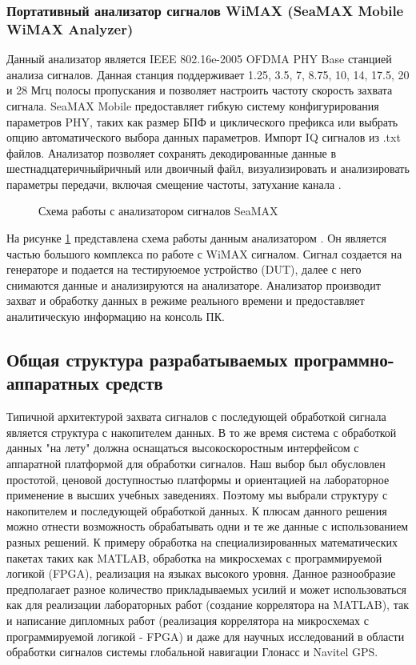 \subsubsection{Портативный анализатор сигналов WiMAX (SeaMAX Mobile WiMAX Analyzer)}
Данный анализатор является IEEE 802.16e-2005 OFDMA PHY Base станцией анализа сигналов. Данная станция 
поддерживает 1.25, 3.5, 7, 8.75, 10, 14, 17.5, 20 и 28 Мгц полосы пропускания и позволяет настроить
частоту скорость захвата сигнала. SeaMAX Mobile предоставляет гибкую систему конфигурирования параметров PHY, таких как
размер БПФ и циклического префикса или выбрать опцию автоматического выбора данных параметров. Импорт IQ сигналов
из .txt файлов. Анализатор позволяет сохранять декодированные данные в шестнадцатеричныйричный или двоичный файл,
визуализировать и анализировать параметры передачи, включая смещение частоты, затухание канала
\cite{seamax_overview, seamax_pdf}.

\begin{figure}[H]
\caption{Схема работы с анализатором сигналов SeaMAX}
\label{seamax}
\end{figure}

На рисунке \ref{seamax} представлена схема работы данным анализатором \cite{seamax_pdf}. Он является частью большого комплекса по работе
с WiMAX сигналом. Сигнал создается на генераторе и подается на тестируюемое устройство (DUT), далее с него снимаются 
данные и анализируются на анализаторе. Анализатор производит захват и обработку данных в режиме реального времени и
предоставляет аналитическую информацию на консоль ПК.

\subsection{Общая структура разрабатываемых программно-аппаратных средств}
\label{razdel13}

Типичной архитектурой захвата сигналов с последующей обработкой сигнала является структура с накопителем данных. В то же время
система с обработкой данных "на лету" должна оснащаться высокоскоростным интерфейсом с аппаратной платформой для обработки
сигналов. Наш выбор был обусловлен простотой, ценовой доступностью платформы и ориентацией на лабораторное применение
в высших учебных заведениях. Поэтому мы выбрали структуру с накопителем и последующей обработкой данных. К плюсам данного решения
можно отнести возможность обрабатывать одни и те же данные с использованием разных решений. К примеру обработка на специализированных
математических пакетах таких как MATLAB, обработка на микросхемах с программируемой логикой (FPGA), реализация на языках высокого уровня.
Данное разнообразие предполагает разное количество прикладываемых усилий и может использоваться как для реализации лабораторных работ
(создание коррелятора на MATLAB), так и написание дипломных работ (реализация коррелятора на микросхемах с программируемой логикой - FPGA) и
даже для научных исследований в области обработки сигналов системы глобальной навигации Глонасс и Navitel GPS.

